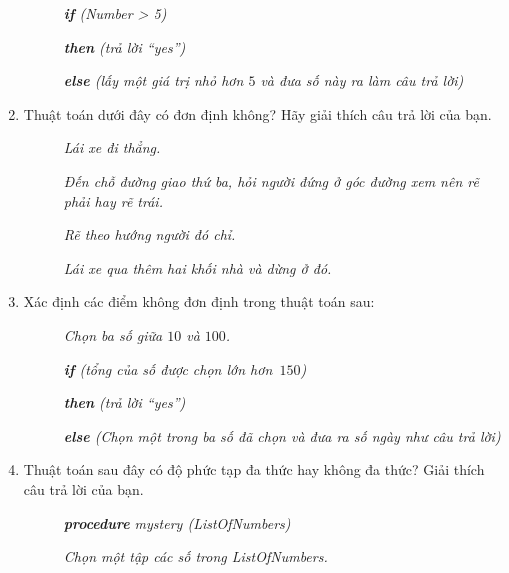 \begin{multicols}{2}
\begin{enumerate}
\begin{description}
    \item []\textsl{\textbf{if} (Number > 5)} 

    \item[] \textsl{\textbf{then} (trả lời ``yes'')} 

    \item [] \textsl{\textbf{else} (lấy một giá trị nhỏ hơn $5$ và đưa số này ra làm câu
        trả lời)}
    \end{description}

  \item Thuật toán dưới đây có đơn định không? Hãy giải thích câu trả lời của bạn.
    \begin{description}
    \item []\textsl{Lái xe đi thẳng.}

    \item [] \textsl{Đến chỗ đường giao thứ ba, hỏi người đứng ở góc đường xem nên rẽ phải
        hay rẽ trái.}

    \item[] \textsl{Rẽ theo hướng người đó chỉ.}

    \item []\textsl{Lái xe qua thêm hai khối nhà và dừng ở đó.}
    \end{description}

  \item Xác định các điểm không đơn định trong thuật toán sau:
    \begin{description}
    \item []\textsl{Chọn ba số giữa $10$ và $100$.}

    \item [] \textsl{\textbf{if} (tổng của số được chọn lớn hơn~$150$)}

    \item[] \textsl{\textbf{then} (trả lời ``yes'')}

    \item []\textsl{\textbf{else} (Chọn một trong ba số đã chọn và đưa ra số ngày như câu
        trả lời)}
    \end{description}

  \item Thuật toán sau đây có độ phức tạp đa thức hay không đa thức? Giải thích câu trả
    lời của bạn.
    \begin{description}
    \item []\textsl{\textbf{procedure} mystery (ListOfNumbers)}

    \item [] \textsl{Chọn một tập các số trong ListOfNumbers.}


\end{description}
\end{enumerate}
\end{multicols}

